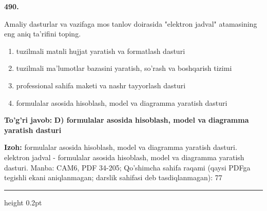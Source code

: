 \documentclass[10pt,a4paper]{article}
\begin{document}
{\bfseries\sffamily\color{ink} 490.}
\par
Amaliy dasturlar va vazifaga mos tanlov doirasida "elektron jadval" atamasining eng aniq ta'rifini toping.
\begin{enumerate}[label=\Alph*),leftmargin=9mm]
\item tuzilmali matnli hujjat yaratish va formatlash dasturi
\item tuzilmali ma'lumotlar bazasini yaratish, so'rash va boshqarish tizimi
\item professional sahifa maketi va nashr tayyorlash dasturi
\item formulalar asosida hisoblash, model va diagramma yaratish dasturi
\end{enumerate}
\begin{tcolorbox}[enhanced,breakable,colback=teal!4,colframe=teal!60!black,boxrule=0.45pt,arc=1.2mm,left=2.7mm,right=2.7mm,top=1.8mm,bottom=1.8mm,before skip=2mm,after skip=2mm]
{\bfseries\sffamily\color{teal}To'g'ri javob:} \textbf{D) formulalar asosida hisoblash, model va diagramma yaratish dasturi}
\par\smallskip
{\bfseries Izoh:} formulalar asosida hisoblash, model va diagramma yaratish dasturi. elektron jadval - formulalar asosida hisoblash, model va diagramma yaratish dasturi. Manba: CAM6, PDF 34-205; Qo'shimcha sahifa raqami (qaysi PDFga tegishli ekani aniqlanmagan; darslik sahifasi deb tasdiqlanmagan): 77
\end{tcolorbox}
\vspace{2mm}\hrule height 0.2pt\vspace{3mm}
\end{document}
